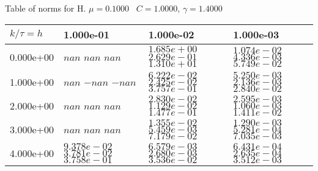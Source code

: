 \begin{center}
Table of norms for H. $\mu = 0.1000$ \, $C = 1.0000$, $\gamma = 1.4000$
  
\begin{tabular}{|p{1in}|p{1in}|p{1in}|p{1in}|} \hline
$k / \tau = h$ &1.000e-01 &1.000e-02 &1.000e-03 \\ \hline 
0.000e+00 & $nan$  $nan$  $nan$  & $1.685e+00$  $2.629e-01$  $1.310e+01$  & $1.074e-02$  $4.336e-03$  $5.749e-02$  \\ \hline 
1.000e+00 & $nan$  $-nan$  $-nan$  & $6.222e-02$  $2.425e-02$  $3.757e-01$  & $5.250e-03$  $2.136e-03$  $2.840e-02$  \\ \hline 
2.000e+00 & $nan$  $nan$  $nan$  & $2.830e-02$  $1.129e-02$  $1.477e-01$  & $2.595e-03$  $1.060e-03$  $1.411e-02$  \\ \hline 
3.000e+00 & $nan$  $nan$  $nan$  & $1.355e-02$  $5.459e-03$  $7.179e-02$  & $1.290e-03$  $5.281e-04$  $7.035e-03$  \\ \hline 
4.000e+00 & $9.378e-02$  $3.781e-02$  $3.758e-01$  & $6.579e-03$  $2.680e-03$  $3.536e-02$  & $6.431e-04$  $2.635e-04$  $3.512e-03$  \\ \hline 

\end{tabular}\\[20pt]
\end{center}
